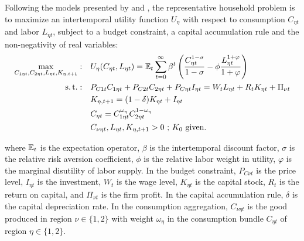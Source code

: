 \documentclass[
thesis.tex
]{subfiles}
\begin{document}
Following the models presented by \textcite{costa_junior_understanding_2016} and \textcite{solis-garcia_ucb_2022}, the representative household problem is to maximize an intertemporal utility function $U_{\eta}$ with respect to consumption $C_{\eta t}$ and labor $L_{\eta t}$, subject to a budget constraint, a capital accumulation rule and the non-negativity of real variables:
\begin{align}
	\max_{C_{1\eta t}, C_{2\eta t}, L_{\eta t},K_{\eta, t+1}}: \quad & U_{\eta}(C_{\eta t},L_{\eta t}) = {\mathbb{E}_{t}} \sum_{t=0}^{\infty} \beta^t \left(\frac{C_{\eta t}^{1-\sigma}}{1-\sigma} - \phi \frac{L_{\eta t}^{1+\varphi}}{1+\varphi} \right) \label{eq:reg-utility-function-0} \\
	\operatorname{s.t.}: \quad & P_{C1t} C_{1\eta t} + P_{C2t} C_{2\eta t} + P_{C\eta t} I_{\eta t} = W_t L_{\eta t} + R_t K_{\eta t} + \Pi_{\nu t} \label{eq:reg-budget-constraint} \\
	\quad & K_{\eta, t+1} = (1-\delta)K_{\eta t} + I_{\eta t} \label{eq:reg-law-of-motion-for-capital} \\
	\quad & C_{\eta t} = C_{1\eta t}^{\omega_{\eta}} C_{2\eta t}^{1-\omega_{\eta}} \label{eq:reg-consumption-aggregation} \\
	\quad & C_{\nu\eta t}, L_{\eta t}, K_{\eta, t+1} > 0 \text{ ; $K_0$ given.} \nonumber
\end{align}

where ${\mathbb{E}_{t}}$ is the expectation operator, $\beta$ is the intertemporal discount factor, $\sigma$ is the relative risk aversion coefficient, $\phi$ is the relative labor weight in utility, $\varphi$ is the marginal disutility of labor supply. In the budget constraint, $P_{C\nu t}$ is the price level, $I_{\eta t}$ is the investment, $W_t$ is the wage level, $K_{\eta t}$ is the capital stock, $R_t$ is the return on capital, and $\Pi_{\nu t}$ is the firm profit. In the capital accumulation rule, $\delta$ is the capital depreciation rate. In the consumption aggregation, $C_{\nu \eta t}$ is the good produced in region $\nu \in \{1,2\}$ with weight ${\omega_\eta}$ in the consumption bundle $C_{\eta t}$ of region $\eta \in \{1,2\}$.
\end{document}
